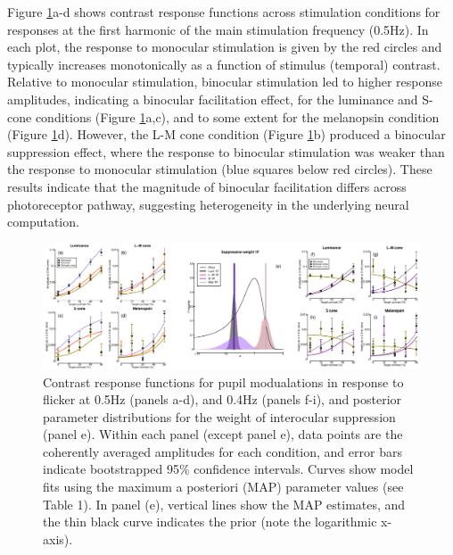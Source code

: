 \documentclass[
]{article}
\begin{document}
Figure \ref{fig:FirstHarmonicPlots}a-d shows contrast response functions across stimulation conditions for responses at the first harmonic of the main stimulation frequency (0.5Hz). In each plot, the response to monocular stimulation is given by the red circles and typically increases monotonically as a function of stimulus (temporal) contrast. Relative to monocular stimulation, binocular stimulation led to higher response amplitudes, indicating a binocular facilitation effect, for the luminance and S-cone conditions (Figure \ref{fig:FirstHarmonicPlots}a,c), and to some extent for the melanopsin condition (Figure \ref{fig:FirstHarmonicPlots}d). However, the L-M cone condition (Figure \ref{fig:FirstHarmonicPlots}b) produced a binocular suppression effect, where the response to binocular stimulation was weaker than the response to monocular stimulation (blue squares below red circles). These results indicate that the magnitude of binocular facilitation differs across photoreceptor pathway, suggesting heterogeneity in the underlying neural computation.

\begin{figure}

{\centering \includegraphics{Figures/FirstHarmonic} 

}

\caption{Contrast response functions for pupil modualations in response to flicker at 0.5Hz (panels a-d), and 0.4Hz (panels f-i), and posterior parameter distributions for the weight of interocular suppression (panel e). Within each panel (except panel e), data points are the coherently averaged amplitudes for each condition, and error bars indicate bootstrapped 95\% confidence intervals. Curves show model fits using the maximum a posteriori (MAP) parameter values (see Table 1). In panel (e), vertical lines show the MAP estimates, and the thin black curve indicates the prior (note the logarithmic x-axis).}\label{fig:FirstHarmonicPlots}
\end{figure}
\end{document}
